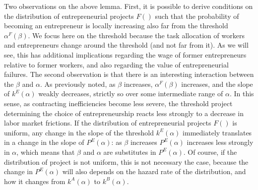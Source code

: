 \documentclass[12pt,american]{paper}
\theoremstyle{remark}
\begin{document}
Two observations on the above lemma. First, it is possible to derive conditions on the distribution of entrepreneurial projects $F()$ such that the probability of becoming an entrepreneur is locally increasing also far from the threshold $\alpha^F(\beta)$. We focus here on the  threshold because the task allocation of workers and entrepreneurs change around the threshold (and not far from it). As we will see, this has additional implications regarding the wage of former entrepreneurs relative to former workers, and also regarding the value of entrepreneurial failures. The second observation is that there is an interesting interaction between the $\beta$ and $\alpha$. As previously noted, as $\beta$ increases, $\alpha^F(\beta)$ increases, and the slope of $k^E(\alpha)$ weakly decreases, strictly so over some intermediate range of $\alpha$. In this sense, as contracting inefficiencies become less severe, the threshold project determining the choice of entrepreneurship reacts less strongly to a decrease in labor market frictions. If the distribution of entrepreneurial projects $F()$ is uniform, any change in the slope of the threshold $k^E(\alpha)$ immediately translates in a change in the slope of $P^E(\alpha)$: as $\beta$ increases $P^E(\alpha)$ increases less strongly in $\alpha$, which means that $\beta$ and $\alpha$ are substitutes in $P^E(\alpha)$. Of course, if the distribution of project  is not uniform, this is not necessary the case, because the change in $P^E(\alpha)$ will also depends on the hazard rate of the distribution, and how it changes from $k^A(\alpha)$ to $k^B(\alpha)$.
\end{document}
